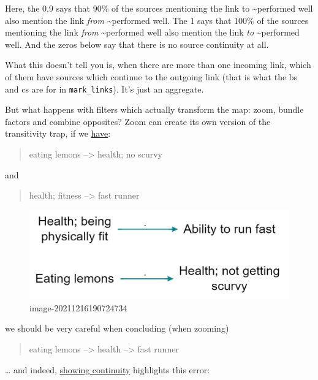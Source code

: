 \documentclass[
]{book}
\begin{document}
Here, the 0.9 says that 90\% of the sources mentioning the link to \textasciitilde performed well also mention the link \emph{from} \textasciitilde performed well. The 1 says that 100\% of the sources mentioning the link \emph{from} \textasciitilde performed well also mention the link \emph{to} \textasciitilde performed well. And the zeros below say that there is no source continuity at all.

What this doesn't tell you is, when there are more than one incoming link, which of them have sources which continue to the outgoing link (that is what the bs and cs are for in \texttt{mark\_links}). It's just an aggregate.

But what happens with filters which actually transform the map: zoom, bundle factors and combine opposites? Zoom can create its own version of the transitivity trap, if we \href{https://causalmap.shinyapps.io/CM2test/?s=415}{have}:

\begin{quote}
eating lemons --\textgreater{} health; no scurvy
\end{quote}

and

\begin{quote}
health; fitness --\textgreater{} fast runner
\end{quote}

\begin{figure}
\centering
\includegraphics[width=6.77083in,height=\textheight]{_assets/image-20211216190724734.png}
\caption{image-20211216190724734}
\end{figure}

we should be very careful when concluding (when zooming)

\begin{quote}
eating lemons --\textgreater{} health --\textgreater{} fast runner
\end{quote}

\ldots{} and indeed, \href{https://causalmap.shinyapps.io/CM2test/?s=416}{showing continuity} highlights this error:
\end{document}
